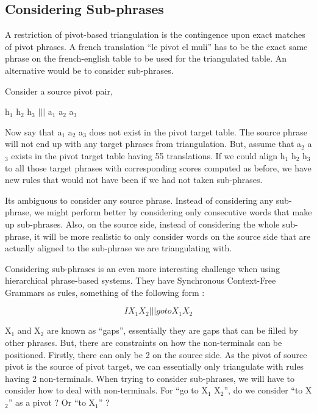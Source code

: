 \subsection{Considering Sub-phrases}
	A restriction of pivot-based triangulation is the contingence upon exact matches of pivot phrases. A french translation ``le pivot el muli'' has to be the exact same phrase on the french-english table to be used for the triangulated table. An alternative would be to consider sub-phrases. 

	Consider a source pivot pair, 

	\indent
		h$_{1}$ h$_{2}$ h$_{3}$ $|||$ a$_{1}$ a$_{2}$ a$_{3}$

	Now say that a$_{1}$ a$_{2}$ a$_{3}$ does not exist in the pivot target table. The source phrase will not end up with any target phrases from triangulation. But, assume that a$_{2}$ a$_{3}$ exists in the pivot target table having 55 translations. If we could align h$_{1}$ h$_{2}$ h$_{3}$ to all those target phrases with corresponding scores computed as before, we have new rules that would not have been if we had not taken sub-phrases. 

	Its ambiguous to consider any source phrase. Instead of considering any sub-phrase, we might perform better by considering only consecutive words that make up sub-phrases. Also, on the source side, instead of considering the whole sub-phrase, it will be more realistic to only consider words on the source side that are actually aligned to the sub-phrase we are triangulating with. 

	Considering sub-phrases is an even more interesting challenge when using hierarchical phrase-based systems. They have Synchronous Context-Free Grammars as rules, something of the following form : 

	\begin{equation}
		I X_{1} X_{2} ||| go to X_{1} X_{2}
	\end{equation}

	X$_{1}$ and X$_{2}$ are known as ``gaps'', essentially they are gaps that can be filled by other phrases. But, there are constraints on how the non-terminals can be positioned. Firstly, there can only be 2 on the source side. As the pivot of source pivot is the source of pivot target, we can essentially only triangulate with rules having 2 non-terminals. When trying to consider sub-phrases, we will have to consider how to deal with non-terminals. For ``go to X$_{1}$ X$_{2}$'', do we consider ``to X$_{2}$'' as a pivot ? Or ``to X$_{1}$'' ? 

